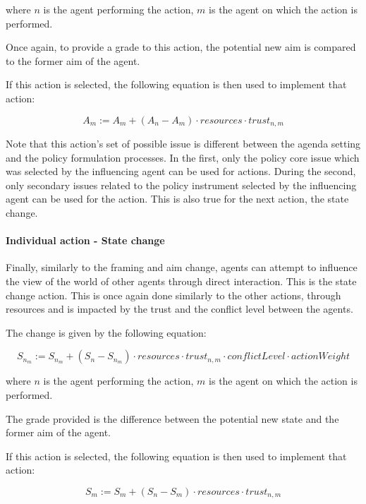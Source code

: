where $n$ is the agent performing the action, $m$ is the agent on which the action is performed.

Once again, to provide a grade to this action, the potential new aim is compared to the former aim of the agent.

If this action is selected, the following equation is then used to implement that action:

\begin{equation}
A_{m} := A_{m} + \left(A_{n} - A_{m} \right) \cdot resources \cdot trust_{n,m}
\end{equation}

Note that this action's set of possible issue is different between the agenda setting and the policy formulation processes. In the first, only the policy core issue which was selected by the influencing agent can be used for actions. During the second, only secondary issues related to the policy instrument selected by the influencing agent can be used for the action. This is also true for the next action, the state change.

\paragraph{Individual action - State change}

Finally, similarly to the framing and aim change, agents can attempt to influence the view of the world of other agents through direct interaction. This is the state change action. This is once again done similarly to the other actions, through resources and is impacted by the trust and the conflict level between the agents.

The change is given by the following equation:

\begin{equation}
S_{n_m} := S_{n_m} + \left(S_{n} - S_{n_m} \right) \cdot resources \cdot trust_{n,m} \cdot conflictLevel \cdot actionWeight
\end{equation}

where $n$ is the agent performing the action, $m$ is the agent on which the action is performed.

The grade provided is the difference between the potential new state and the former aim of the agent.

If this action is selected, the following equation is then used to implement that action:

\begin{equation}
S_{m} := S_{m} + \left(S_{n} - S_{m} \right) \cdot resources \cdot trust_{n,m}
\end{equation}

